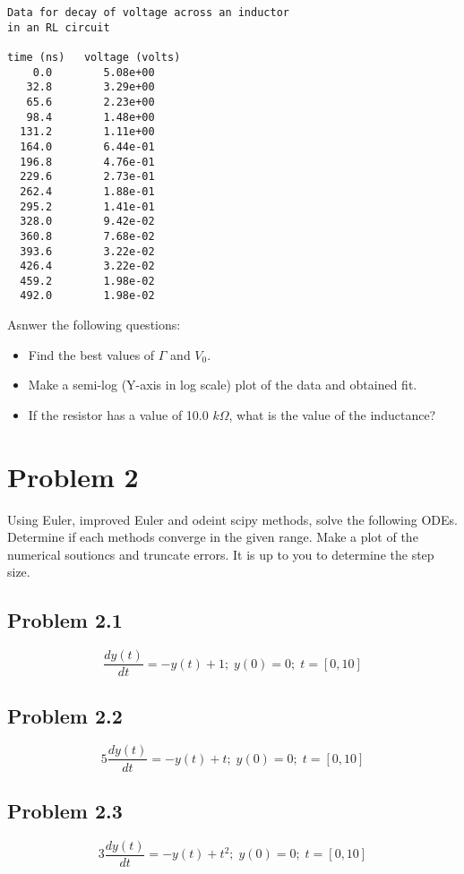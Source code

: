 \documentclass[10.5pt]{article}
\begin{document}
\begin{verbatim}
Data for decay of voltage across an inductor
in an RL circuit

time (ns)   voltage (volts)
    0.0        5.08e+00    
   32.8        3.29e+00    
   65.6        2.23e+00    
   98.4        1.48e+00    
  131.2        1.11e+00    
  164.0        6.44e-01    
  196.8        4.76e-01    
  229.6        2.73e-01    
  262.4        1.88e-01    
  295.2        1.41e-01    
  328.0        9.42e-02    
  360.8        7.68e-02    
  393.6        3.22e-02    
  426.4        3.22e-02    
  459.2        1.98e-02    
  492.0        1.98e-02    
\end{verbatim}

Asnwer the following questions:

\begin{itemize}
\item Find the best values of $\Gamma$ and $V_{0}$.
\item Make a semi-log (Y-axis in log scale) plot of the data and obtained fit.
\item If the resistor has a value of 10.0 $k\Omega$, what is the value of the inductance?
\end{itemize}

\section{Problem 2}

Using Euler, improved Euler and odeint scipy methods, solve the following ODEs. Determine if each methods converge in the given range. Make a plot of the numerical soutioncs and truncate errors. It is up to you to determine the step size.
    
\subsection{Problem 2.1}

\begin{equation}
\frac{dy(t)}{dt}=-y(t) + 1;\; y(0)=0;\; t=[0,10]
\end{equation}

\subsection{Problem 2.2}

\begin{equation}
5\frac{dy(t)}{dt}=-y(t) + t;\; y(0)=0;\; t=[0,10]
\end{equation}

\subsection{Problem 2.3}

\begin{equation}
3\frac{dy(t)}{dt}=-y(t) + t^{2};\; y(0)=0;\; t=[0,10]
\end{equation}
\end{document}
